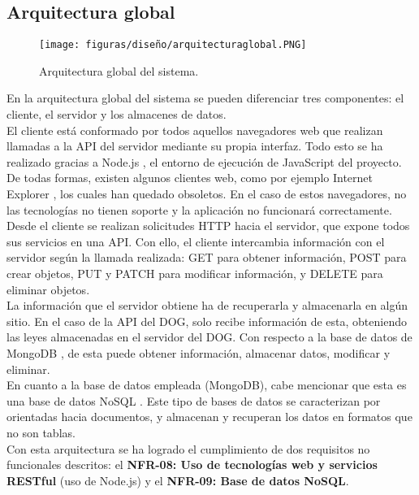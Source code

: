 \subsection{Arquitectura global}

\begin{figure}[H]
\centerline{\texttt{[image: figuras/diseño/arquitecturaglobal.PNG]}}
\caption{Arquitectura global del sistema.}
\label{enlaceArquitecturaGlobal}
\end{figure}

En la arquitectura global del sistema se pueden diferenciar tres componentes: el cliente, el servidor y los almacenes de datos.
\\

El cliente está conformado por todos aquellos navegadores web que realizan llamadas a la API del servidor mediante su propia interfaz. Todo esto se ha realizado gracias a Node.js \cite{nodejs}, el entorno de ejecución de JavaScript del proyecto.
\\

De todas formas, existen algunos clientes web, como por ejemplo Internet Explorer \cite{explorer}, los cuales han quedado obsoletos. En el caso de estos navegadores, no las tecnologías no tienen soporte y la aplicación no funcionará correctamente.
\\

Desde el cliente se realizan solicitudes HTTP hacia el servidor, que expone todos sus servicios en una API. Con ello, el cliente intercambia información con el servidor según la llamada realizada: GET para obtener información, POST para crear objetos, PUT y PATCH para modificar información, y DELETE para eliminar objetos.
\\

La información que el servidor obtiene ha de recuperarla y almacenarla en algún sitio. En el caso de la API del DOG, solo recibe información de esta, obteniendo las leyes almacenadas en el servidor del DOG. Con respecto a la base de datos de MongoDB \cite{mongodb}, de esta puede obtener información, almacenar datos, modificar y eliminar.
\\

En cuanto a la base de datos empleada (MongoDB), cabe mencionar que esta es una base de datos NoSQL \cite{nosql}. Este tipo de bases de datos se caracterizan por orientadas hacia documentos, y almacenan y recuperan los datos en formatos que no son tablas.
\\

Con esta arquitectura se ha logrado el cumplimiento de dos requisitos no funcionales descritos: el {\bf NFR-08: Uso de tecnologías web y servicios RESTful} (uso de Node.js) y el {\bf NFR-09: Base de datos NoSQL}.